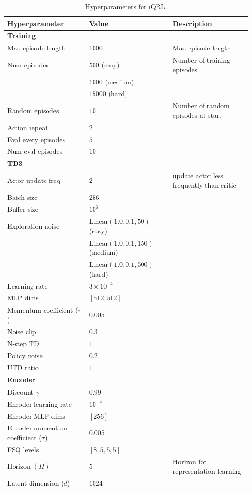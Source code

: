 \documentclass{article}
\theoremstyle{plain}
\theoremstyle{definition}
\theoremstyle{remark}
\newcommand{\our}{\textsc{iQRL}\xspace}
\begin{document}
\begin{table}[h]
\caption{Hyperparameters for \our.}
\label{tab:hyperparameters}
\vskip 0.15in
\begin{center}
\begin{small}
\begin{sc}
\begin{tabular}{lll}
\toprule
Hyperparameter & Value & Description \\
\midrule
\textbf{Training} & & \\
Max episode length & 1000 &  Max episode length \\
Num episodes & $500$ (easy) & Number of training episodes \\
             & $1000$ (medium) & \\
             & $15000$ (hard) & \\
Random episodes & $10$ & Number of random episodes at start \\
Action repeat & 2 & \\
Eval every episodes & $5$ & \\
Num eval episodes & $10$ & \\
\hline
\textbf{TD3} & & \\
Actor update freq & $2$  & update actor less frequently than critic \\
Batch size & $256$ & \\
Buffer size & $10^{6}$ & \\
Exploration noise & $\mathrm{Linear}(1.0,0.1,50)$ (easy) & \\
                  & $\mathrm{Linear}(1.0,0.1,150)$ (medium) & \\
                  & $\mathrm{Linear}(1.0,0.1,500)$ (hard) & \\
Learning rate & $3 \times 10^{-4}$ & \\
MLP dims & $[512, 512]$ & \\
Momentum coefficient ($\tau$) & $0.005$ & \\
Noise clip & $0.3$ & \\
N-step TD & $1$ & \\
Policy noise & $0.2$ & \\
UTD ratio & $1$ & \\
\hline
\textbf{Encoder} &  & \\
Discount $\gamma$ & $0.99$ & \\
Encoder learning rate & $10^{-4}$ & \\
Encoder MLP dims & $[256]$ & \\
Encoder momentum coefficient ($\tau$) & 0.005 & \\
FSQ levels & $[8, 5, 5, 5]$ & \\
Horizon $(H)$ & $5$ & Horizon for representation learning \\
Latent dimension ($d$) & $1024$ & \\
 \bottomrule
\end{tabular}
\end{sc}
\end{small}
\end{center}
\vskip -0.1in
\end{table}
\end{document}
